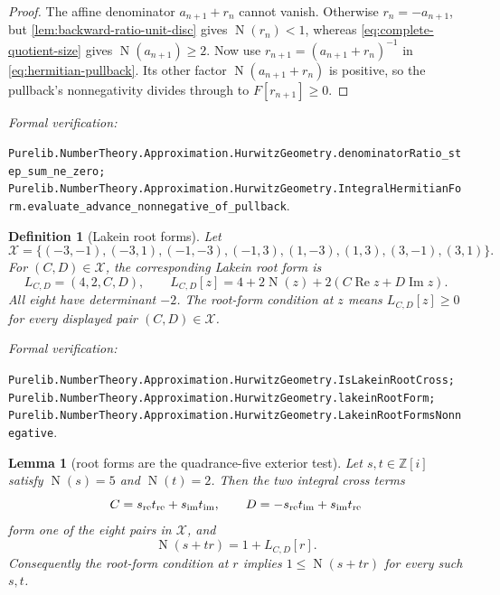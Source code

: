 \documentclass[11pt]{article}
\newtheorem{lemma}[lemma]{Lemma}
\newtheorem{definition}[definition]{Definition}
\newcommand{\Zi}{\mathbb{Z}[i]}
\newcommand{\Norm}[1]{\operatorname{N}\!\left(#1\right)}
\newcommand{\leanref}[1]{\par\smallskip\noindent
  \emph{Formal verification:}\par\nobreak
  {\raggedright\nolinkurl{#1}.\par}}
\begin{document}
\begin{proof}
The affine denominator $a_{n+1}+r_n$ cannot vanish.  Otherwise
$r_n=-a_{n+1}$, but \cref{lem:backward-ratio-unit-disc} gives
$\Norm{r_n}<1$, whereas \eqref{eq:complete-quotient-size} gives
$\Norm{a_{n+1}}\ge2$.  Now use
$r_{n+1}=(a_{n+1}+r_n)^{-1}$ in
\eqref{eq:hermitian-pullback}.  Its other factor
$\Norm{a_{n+1}+r_n}$ is positive, so the pullback's nonnegativity divides
through to $F[r_{n+1}]\ge0$.
\end{proof}

\leanref{Purelib.NumberTheory.Approximation.HurwitzGeometry.denominatorRatio_step_sum_ne_zero;
Purelib.NumberTheory.Approximation.HurwitzGeometry.IntegralHermitianForm.evaluate_advance_nonnegative_of_pullback}

\begin{definition}[Lakein root forms]
\label{def:lakein-root-forms}
Let
\[
 \mathcal X=\{(-3,-1),(-3,1),(-1,-3),(-1,3),
                 (1,-3),(1,3),(3,-1),(3,1)\}.
\]
For $(C,D)\in\mathcal X$, the corresponding \emph{Lakein root form} is
\begin{equation}
\label{eq:lakein-root-form}
             L_{C,D}=(4,2,C,D),
 \qquad
             L_{C,D}[z]
               =4+2\Norm z+2(C\operatorname{Re}z+D\operatorname{Im}z).
\end{equation}
All eight have determinant $-2$.  The \emph{root-form condition} at $z$
means $L_{C,D}[z]\ge0$ for every displayed pair $(C,D)\in\mathcal X$.
\end{definition}

\leanref{Purelib.NumberTheory.Approximation.HurwitzGeometry.IsLakeinRootCross;
Purelib.NumberTheory.Approximation.HurwitzGeometry.lakeinRootForm;
Purelib.NumberTheory.Approximation.HurwitzGeometry.LakeinRootFormsNonnegative}

\begin{lemma}[root forms are the quadrance-five exterior test]
\label{lem:root-form-exterior}
Let $s,t\in\Zi$ satisfy $\Norm s=5$ and $\Norm t=2$.  Then the two integral
cross terms
\[
 C=s_{\rm re}t_{\rm re}+s_{\rm im}t_{\rm im},
 \qquad
 D=-s_{\rm re}t_{\rm im}+s_{\rm im}t_{\rm re}
\]
form one of the eight pairs in $\mathcal X$, and
\begin{equation}
\label{eq:root-form-factor}
                       \Norm{s+tr}=1+L_{C,D}[r].
\end{equation}
Consequently the root-form condition at $r$ implies
$1\le\Norm{s+tr}$ for every such $s,t$.
\end{lemma}
\end{document}
